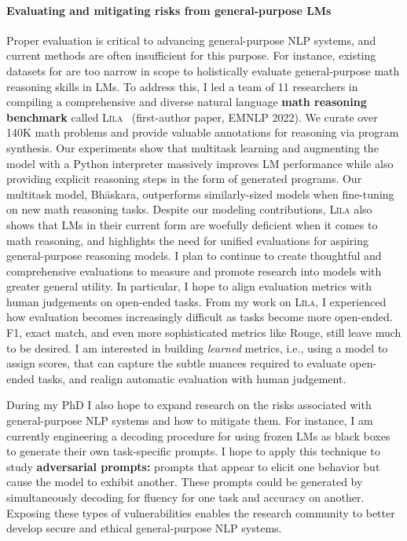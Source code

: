 \documentclass[11pt]{article}
\newcommand\lila{\textsc{L\={\i}la}\xspace}
\begin{document}
\paragraph{Evaluating and mitigating risks from general-purpose LMs}
Proper evaluation is critical to advancing general-purpose NLP systems,
and current methods are often insufficient for this purpose.
For instance, existing datasets for are too narrow in scope 
to holistically evaluate general-purpose math reasoning skills in LMs.
To address this,
I led a team of 11 researchers in compiling a
comprehensive and diverse natural language 
\textbf{math reasoning benchmark} 
called \lila~\cite{Mishra2022LilaAU} (first-author paper, EMNLP 2022).
We curate over 140K math problems
and provide valuable annotations for reasoning via program synthesis. 
Our experiments show that multitask learning 
and augmenting the model with a Python interpreter
massively improves LM performance 
while also providing explicit reasoning steps in the form of generated programs.
Our multitask model, Bh\=askara, 
outperforms similarly-sized models
when fine-tuning on new math reasoning tasks.
Despite our modeling contributions, \lila also shows that LMs 
in their current form 
are woefully deficient when it comes to math reasoning,
and highlights the need for unified evaluations for 
aspiring general-purpose reasoning models.
I plan to continue to create thoughtful and comprehensive evaluations 
to measure and promote research into models with greater general utility.
In particular, I hope to align evaluation metrics
with human judgements on open-ended tasks. 
From my work on \lila, 
I experienced how evaluation becomes increasingly difficult 
as tasks become more open-ended.
F1, exact match, and even more sophisticated metrics like Rouge,
still leave much to be desired.
I am interested in building \emph{learned} metrics, 
i.e., using a model to assign scores,
that can capture the subtle nuances required to evaluate open-ended tasks,
and realign automatic evaluation with human judgement.

During my PhD I also hope to expand research on the risks associated 
with general-purpose NLP systems and how to mitigate them.
For instance, I am currently engineering a decoding procedure 
for using frozen LMs as black boxes
to generate their own task-specific prompts.
I hope to apply this technique
to study \textbf{adversarial prompts:}
prompts that appear to elicit one behavior 
but cause the model to exhibit another.
These prompts could be generated by simultaneously 
decoding for fluency for one task and accuracy on another.
Exposing these types of vulnerabilities
enables the research community to better develop
secure and ethical general-purpose NLP systems. 
\end{document}
